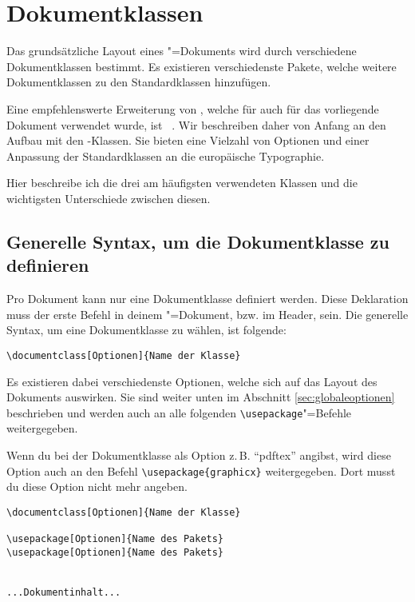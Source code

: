 %
%

\chapter{Dokumentklassen}
\label{sec:dokumentklassen}

Das grundsätzliche Layout eines \DMLLaTeX"=Dokuments wird durch verschiedene Dokumentklassen bestimmt. Es existieren verschiedenste Pakete, welche weitere Dokumentklassen zu den Standardklassen hinzufügen.

Eine empfehlenswerte Erweiterung von \DMLLaTeX, welche für auch für das vorliegende Dokument verwendet wurde, ist \KOMAScript~\cite{KOMA}. Wir beschreiben daher von Anfang an den Aufbau mit den \KOMAScript-Klassen. Sie bieten eine Vielzahl von Optionen und einer Anpassung der Standardklassen an die europäische Typographie.

Hier beschreibe ich die drei am häufigsten verwendeten Klassen und die wichtigsten Unterschiede zwischen diesen.

\section{Generelle Syntax, um die Dokumentklasse zu definieren}

Pro Dokument kann nur eine Dokumentklasse definiert werden. Diese Deklaration muss der erste Befehl in deinem \DMLLaTeX"=Dokument, bzw. im Header, sein. Die generelle Syntax, um eine Dokumentklasse zu wählen, ist folgende:
\begin{lstlisting}
\documentclass[Optionen]{Name der Klasse}
\end{lstlisting}

Es existieren dabei verschiedenste Optionen, welche sich auf das Layout des Dokuments auswirken. Sie sind weiter unten im Abschnitt \ref{sec:globaleoptionen} beschrieben und werden auch an alle folgenden \texttt{\textbackslash usepackage}"=Befehle weitergegeben. 

Wenn du bei der Dokumentklasse als Option z.\,B. \enquote{pdftex} angibst, wird diese Option auch an den Befehl \texttt{\textbackslash usepackage\{graphicx\}} weitergegeben. Dort musst du diese Option nicht mehr angeben.
\begin{lstlisting}
\documentclass[Optionen]{Name der Klasse}

\usepackage[Optionen]{Name des Pakets}
\usepackage[Optionen]{Name des Pakets}


...Dokumentinhalt...

\end{lstlisting}

